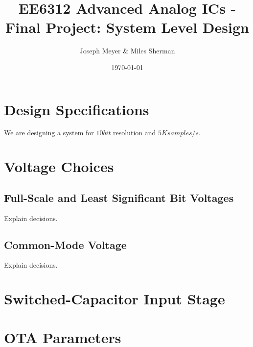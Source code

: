 \documentclass{article}
\begin{document}
\title{EE6312 Advanced Analog ICs - Final Project: System Level Design}
\author{Joseph Meyer \& Miles Sherman}
\date{\today}
\maketitle

\section{Design Specifications}
We are designing a system for $10bit$ resolution and $5K samples/s$.

\section{Voltage Choices}
\subsection{Full-Scale and Least Significant Bit Voltages}
Explain decisions.

\subsection{Common-Mode Voltage}
Explain decisions.

\section{Switched-Capacitor Input Stage}

\section{OTA Parameters}



%
\end{document}
